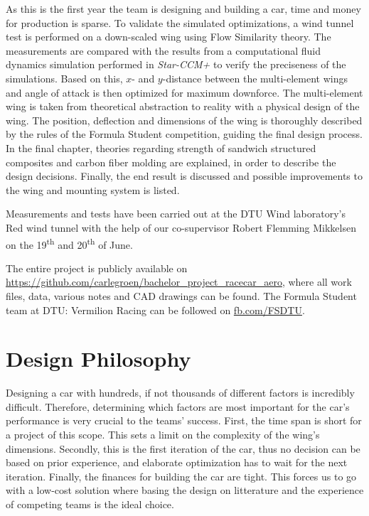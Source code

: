  As this is the first year the team is designing and building a car, time and money for production is sparse. To validate the simulated optimizations, a wind tunnel test is performed on a down-scaled wing using Flow Similarity theory. The measurements are compared with the results from a computational fluid dynamics simulation performed in \emph{Star-CCM+} to verify the preciseness of the simulations. Based on this, $x$- and $y$-distance between the multi-element wings and angle of attack is then optimized for maximum downforce. The multi-element wing is taken from theoretical abstraction to reality with a physical design of the wing. The position, deflection and dimensions of the wing is thoroughly described by the rules of the Formula Student competition, guiding the final design process. In the final chapter, theories regarding strength of sandwich structured composites and carbon fiber molding are explained, in order to describe the design decisions. Finally, the end result is discussed and possible improvements to the wing and mounting system is listed.

  Measurements and tests have been carried out at the DTU Wind laboratory's Red wind tunnel with the help of our co-supervisor Robert Flemming Mikkelsen on the 19\textsuperscript{th} and 20\textsuperscript{th} of June.

  The entire project is publicly available on \url{https://github.com/carlegroen/bachelor_project_racecar_aero}, where all work files, data, various notes and CAD drawings can be found. The Formula Student team at DTU: Vermilion Racing can be followed on \url{fb.com/FSDTU}.

\section{Design Philosophy}
  Designing a car with hundreds, if not thousands of different factors is incredibly difficult. Therefore, determining which factors are most important for the car's performance is very crucial to the teams' success. First, the time span is short for a project of this scope. This sets a limit on the complexity of the wing's dimensions. Secondly, this is the first iteration of the car, thus no decision can be based on prior experience, and elaborate optimization has to wait for the next iteration. Finally, the finances for building the car are tight. This forces us to go with a low-cost solution where basing the design on litterature and the experience of competing teams is the ideal choice.

